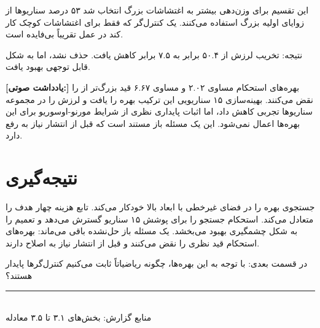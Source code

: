 \documentclass[12pt, a4paper]{article}
\newcommand{\dash}{\lr{---}}
\begin{document}
اين تقسيم برای وزن‌دهی بيشتر به اغتشاشات بزرگ انتخاب شد \dash{} ۵۳ درصد سناريوها از زوايای اوليه بزرگ استفاده می‌کنند. يک کنترل‌گر که فقط برای اغتشاشات کوچک کار کند در عمل تقريباً بی‌فايده است.

نتيجه: تخريب لرزش از ۵۰.۴ برابر به ۷.۵ برابر کاهش يافت. حذف نشد، اما به شکل قابل توجهی بهبود يافت.


\begin{mdframed}[
  backgroundcolor=audiotan,
  linecolor=audionote!70,
  linewidth=1pt,
  innerleftmargin=12pt,
  innerrightmargin=12pt,
  innertopmargin=8pt,
  innerbottommargin=8pt
]
\textbf{\color{audionote}[يادداشت صوتی:]}
بهره‌های  استحکام  مساوی ۲.۰۲ و  مساوی ۶.۶۷ قيد  بزرگ‌تر از  را نقض می‌کنند. بهينه‌سازی ۱۵ سناريويی اين ترکيب بهره را يافت و لرزش را در مجموعه سناريوها تجربی کاهش داد، اما اثبات پايداری نظری از شرايط مورنو-اوسوريو برای اين بهره‌ها اعمال نمی‌شود. اين يک مسئله باز مستند است که قبل از انتشار نياز به رفع دارد.
\end{mdframed}

\vspace{0.6cm}

\section{نتيجه‌گيری}

 جستجوی بهره را در فضای غيرخطی با ابعاد بالا خودکار می‌کند. تابع هزينه چهار هدف را متعادل می‌کند.  استحکام جستجو را برای پوشش ۱۵ سناريو گسترش می‌دهد و تعميم را به شکل چشمگيری بهبود می‌بخشد. يک مسئله باز حل‌نشده باقی می‌ماند: بهره‌های استحکام  قيد نظری را نقض می‌کنند و قبل از انتشار نياز به اصلاح دارند.

در قسمت بعدی: با توجه به اين بهره‌ها، چگونه رياضياتاً ثابت می‌کنيم کنترل‌گرها پايدار هستند؟

\vspace{1.5cm}
\begin{center}
{\color{seriesblue}\rule{0.45\linewidth}{0.4pt}}\\[8pt]
{\small\color{sectiongray}
منابع گزارش: بخش‌های ۳.۱ تا ۳.۵ \dash{} معادله 
}
\end{center}
\end{document}
